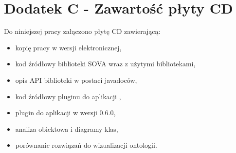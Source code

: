 \chapter*{Dodatek C - Zawartość płyty CD}

Do niniejszej pracy załączono płytę CD zawierającą:
\begin{itemize}
 \item kopię pracy w wersji elektronicznej,
 \item kod źródłowy biblioteki SOVA wraz z użytymi bibliotekami, 
 \item opis API biblioteki w postaci javadoców,
 \item kod źródłowy pluginu do aplikacji \protege,
 \item plugin do aplikacji \proteges w wersji 0.6.0,
 \item analiza obiektowa i diagramy klas,
 \item porównanie rozwiązań do wizualizacji ontologii.  
\end{itemize}
